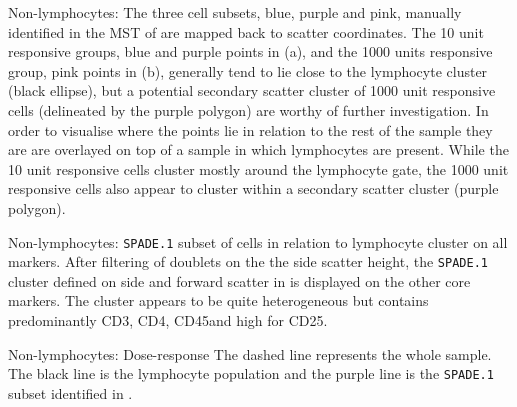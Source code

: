 {
  Non-lymphocytes: The three cell subsets, blue, purple and pink, manually identified in the \gls{MST} of   are mapped back to scatter coordinates.
  The 10 unit responsive groups, blue and purple points in (a), and the 1000 units responsive group, pink points in (b),
  generally tend to lie close to the lymphocyte cluster (black ellipse), but a potential secondary scatter cluster of 1000 unit responsive cells
  (delineated by the purple polygon) are worthy of further investigation.
}
{
  In order to visualise where the points lie in relation to the rest of the sample they are are overlayed on top of a sample in which lymphocytes are present.
  While the 10 unit responsive cells cluster mostly around the lymphocyte gate, 
  the 1000 unit responsive cells also appear to cluster within a secondary scatter cluster (purple polygon).
}


{
    Non-lymphocytes: \texttt{SPADE.1} subset of cells in relation to lymphocyte cluster on all markers.
}
{
  After filtering of doublets on the the side scatter height, the \texttt{SPADE.1} cluster defined on side and forward scatter in 
  is displayed on the other core markers.
  The cluster appears to be quite heterogeneous but contains predominantly CD3\positive, CD4\positive, CD45\positive and high for CD25.
}


{ Non-lymphocytes: Dose-response }
{
    The dashed line represents the whole sample.
    The black line is the lymphocyte population and the purple line is the \texttt{SPADE.1} subset identified in .
}

\clearpage



